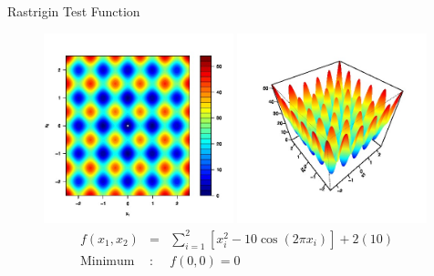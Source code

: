 \documentclass[ xcolor = pdftex, dvipsnames, table ]{beamer}
\begin{document}
%
%

\subsection{}
\begin{frame}{Rastrigin Test Function}
\vspace{-0.3cm}
\begin{figure}[!h]
        \centering
        \includegraphics[width=0.49\textwidth]{rastContour.jpg}
        \includegraphics[width=0.49\textwidth]{rastPersp.jpg}
        \vspace{-0.5cm}
        \begin{eqnarray}
        f(x_1, x_2) &=& \sum_{i=1}^2\left[x_i^2-10\cos(2\pi x_i)\right] + 2(10)\nonumber\\
        \label{rastEq}
        \text{Minimum}&:& f(0, 0)=0\nonumber
        \end{eqnarray}
\end{figure}
\end{frame}
\end{document}
